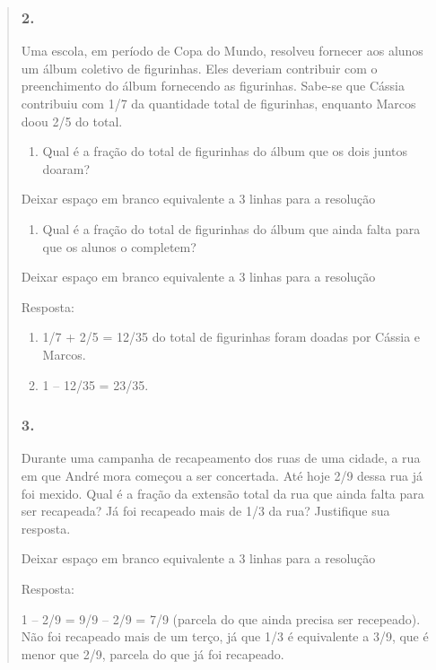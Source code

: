 \begin{enumerate}
\begin{escolha}
\begin{enumerate}
\begin{itemize}
\begin{itemize}
\begin{escolha}
\begin{quote}
\begin{escolha}
{\subsubsection{2.}\label{section-105}

Uma escola, em período de Copa do Mundo, resolveu fornecer aos alunos um
álbum coletivo de figurinhas. Eles deveriam contribuir com o
preenchimento do álbum fornecendo as figurinhas. Sabe-se que Cássia
contribuiu com 1/7 da quantidade total de figurinhas, enquanto Marcos
doou 2/5 do total.

\begin{enumerate}
\def\labelenumi{\alph{enumi})}
\item
  Qual é a fração do total de figurinhas do álbum que os dois juntos doaram?
\end{enumerate}

Deixar espaço em branco equivalente a 3 linhas para a resolução

\begin{enumerate}
\def\labelenumi{\alph{enumi})}
\item
  Qual é a fração do total de figurinhas do álbum que ainda falta para que os
  alunos o completem?
\end{enumerate}

Deixar espaço em branco equivalente a 3 linhas para a resolução

Resposta:

\begin{enumerate}
\def\labelenumi{\alph{enumi})}
\item
  1/7 + 2/5 = 12/35 do total de figurinhas foram doadas por Cássia e
  Marcos.
\item
  1 -- 12/35 = 23/35.
\end{enumerate}

\subsubsection{3.}\label{section-106}

Durante uma campanha de recapeamento dos ruas de uma cidade, a rua em
que André mora começou a ser concertada. Até hoje 2/9 dessa rua já foi mexido.
Qual é a fração da extensão total da rua que ainda falta para ser
recapeada? Já foi recapeado mais de 1/3 da rua? Justifique sua resposta.

Deixar espaço em branco equivalente a 3 linhas para a resolução

Resposta:

1 -- 2/9 = 9/9 -- 2/9 = 7/9 (parcela do que ainda precisa ser recepeado).
Não foi recapeado mais de um terço, já que 1/3 é equivalente a 3/9, que é menor que 2/9, parcela do que já foi recapeado.

}
\end{escolha}
\end{quote}
\end{escolha}
\end{itemize}
\end{itemize}
\end{enumerate}
\end{escolha}
\end{enumerate}
